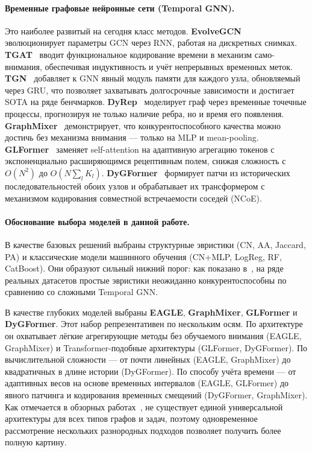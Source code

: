 \documentclass[a4paper,12pt]{extarticle}
\begin{document}
\paragraph{Временные графовые нейронные сети (Temporal GNN).}
Это наиболее развитый на сегодня класс методов. \textbf{EvolveGCN}~\cite{pareja2019evolvegcn} эволюционирует параметры GCN через RNN, работая на дискретных снимках. \textbf{TGAT}~\cite{xu2020inductive} вводит функциональное кодирование времени в механизм само-внимания, обеспечивая индуктивность и учёт непрерывных временных меток. \textbf{TGN}~\cite{rossi2020temporal} добавляет к GNN явный модуль памяти для каждого узла, обновляемый через GRU, что позволяет захватывать долгосрочные зависимости и достигает SOTA на ряде бенчмарков. \textbf{DyRep}~\cite{trivedi2019representation} моделирует граф через временные точечные процессы, прогнозируя не только наличие ребра, но и время его появления. \textbf{GraphMixer}~\cite{cong2023graphmixer} демонстрирует, что конкурентоспособного качества можно достичь без механизма внимания --- только на MLP и mean-pooling. \textbf{GLFormer}~\cite{liao2024glformer} заменяет self-attention на адаптивную агрегацию токенов с экспоненциально расширяющимся рецептивным полем, снижая сложность с $O(N^2)$ до $O(N \sum_l K_l)$. \textbf{DyGFormer}~\cite{yu2023towards} формирует патчи из исторических последовательностей обоих узлов и обрабатывает их трансформером с механизмом кодирования совместной встречаемости соседей (NCoE).

\paragraph{Обоснование выбора моделей в данной работе.}
В качестве базовых решений выбраны структурные эвристики (CN, AA, Jaccard, PA) и классические модели машинного обучения (CN+MLP, LogReg, RF, CatBoost). Они образуют сильный нижний порог: как показано в~\cite{poursafaei2022towards}, на ряде реальных датасетов простые эвристики неожиданно конкурентоспособны по сравнению со сложными Temporal GNN.

В качестве глубоких моделей выбраны \textbf{EAGLE}, \textbf{GraphMixer}, \textbf{GLFormer} и \textbf{DyGFormer}. Этот набор репрезентативен по нескольким осям. По архитектуре он охватывает лёгкие агрегирующие методы без обучаемого внимания (EAGLE, GraphMixer) и Transformer-подобные архитектуры (GLFormer, DyGFormer). По вычислительной сложности --- от почти линейных (EAGLE, GraphMixer) до квадратичных в длине истории (DyGFormer). По способу учёта времени --- от адаптивных весов на основе временных интервалов (EAGLE, GLFormer) до явного патчинга и кодирования временных смещений (DyGFormer, GraphMixer). Как отмечается в обзорных работах~\cite{xiong2026survey}, не существует единой универсальной архитектуры для всех типов графов и задач, поэтому одновременное рассмотрение нескольких разнородных подходов позволяет получить более полную картину.
\end{document}
